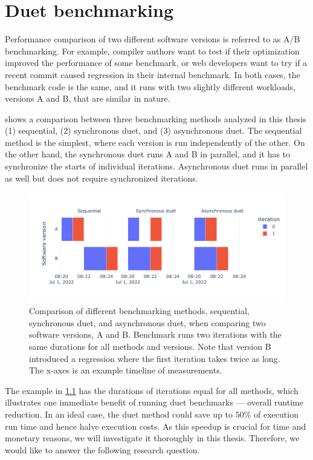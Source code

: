 \chapter{Duet benchmarking}
\label{chap:duet}

Performance comparison of two different software versions is referred to as A/B benchmarking.
For example, compiler authors want to test if their optimization improved the performance of some benchmark, or web developers want to try if a recent commit caused regression in their internal benchmark.
In both cases, the benchmark code is the same, and it runs with two slightly different workloads, versions A and B, that are similar in nature.

 shows a comparison between three benchmarking methods analyzed in this thesis (1) sequential, (2) synchronous duet, and (3) asynchronous duet.
The sequential method is the simplest, where each version is run independently of the other.
On the other hand, the synchronous duet runs A and B in parallel, and it has to synchronize the starts of individual iterations.
Asynchronous duet runs in parallel as well but does not require synchronized iterations.

\begin{figure}[!ht]
	\centering
	\includegraphics[width=.9\linewidth]{./figures/method_timeline.pdf}
	\caption{
	Comparison of different benchmarking methods, sequential, synchronous duet, and asynchronous duet, when comparing two software versions, A and B.
	Benchmark runs two iterations with the same durations for all methods and versions.
	Note that version B introduced a regression where the first iteration takes twice as long.
	The \mbox{x-axes} is an example timeline of measurements.
	}
	\label{fig:method_timeline}
\end{figure}

The example in \cref{fig:method_timeline} has the durations of iterations equal for all methods, which illustrates one immediate benefit of running duet benchmarks --- overall runtime reduction.
In an ideal case, the duet method could save up to $50\%$ of execution run time and hence halve execution costs.
As this speedup is crucial for time and monetary reasons, we will investigate it thoroughly in this thesis.
Therefore, we would like to answer the following research question.

